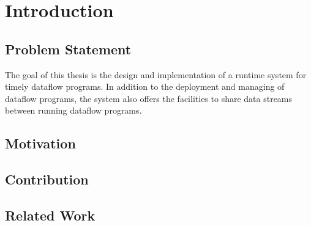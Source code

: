 \chapter{Introduction}\label{ch:introduction}

\section{Problem Statement}

The goal of this thesis is the design and implementation of a runtime system
for timely dataflow programs. In addition to the deployment and managing of
dataflow programs, the system also offers the facilities to share data streams
between running dataflow programs.


\section{Motivation}

\section{Contribution}

\section{Related Work}

\TODO{}
